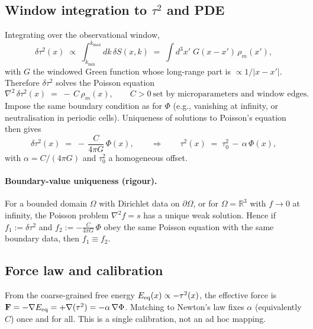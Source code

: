 \documentclass[11pt]{article}
\begin{document}
\subsection*{Window integration to $\tau^2$ and PDE}
Integrating over the observational window,
\begin{equation}
  \delta\tau^2(x) \;\propto\; \int_{k_{\min}}^{k_{\max}}\! dk\, \delta S(x,k) \;=\; \int d^3x'\; G(x-x')\, \rho_m(x'),
\end{equation}
with $G$ the windowed Green function whose long-range part is $\propto 1/|x-x'|$. Therefore $\delta\tau^2$ solves the Poisson equation
\begin{equation}
  \nabla^2\, \delta\tau^2(x) \;=\; -\, C\, \rho_m(x), \qquad C>0~\text{set by microparameters and window edges}.\label{eq:poisson-tau}
\end{equation}
Impose the same boundary condition as for $\Phi$ (e.g., vanishing at infinity, or neutralisation in periodic cells). Uniqueness of solutions to Poisson's equation then gives
\begin{equation}
  \delta\tau^2(x) \;=\; -\, \frac{C}{4\pi G}\, \Phi(x), \qquad \Rightarrow\qquad \tau^2(x) \;=\; \tau_0^2 \,-\, \alpha\, \Phi(x),\label{eq:tau2-phi}
\end{equation}
with $\alpha=C/(4\pi G)$ and $\tau_0^2$ a homogeneous offset.

\paragraph{Boundary-value uniqueness (rigour).} For a bounded domain $\Omega$ with Dirichlet data on $\partial\Omega$, or for $\Omega=\mathbb R^3$ with $f\to0$ at infinity, the Poisson problem $\nabla^2 f = s$ has a unique weak solution. Hence if $f_1:=\delta\tau^2$ and $f_2:= -\frac{C}{4\pi G}\,\Phi$ obey the same Poisson equation with the same boundary data, then $f_1\equiv f_2$.

\subsection*{Force law and calibration}
From the coarse-grained free energy $E_{\rm eq}(x)\propto -\tau^2(x)$, the effective force is $\mathbf F = -\nabla E_{\rm eq} = +\nabla(\tau^2) = -\alpha\, \nabla\Phi$. Matching to Newton’s law fixes $\alpha$ (equivalently $C$) once and for all. This is a single calibration, not an ad hoc mapping.
\end{document}
